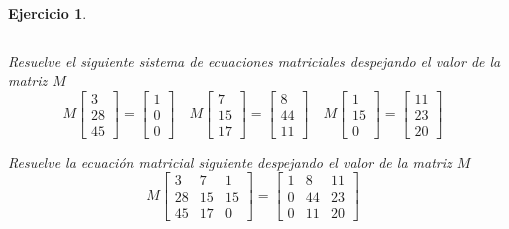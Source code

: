 \documentclass[12pt]{amsart}
\newtheorem{ejer}{Ejercicio}
\begin{document}
\begin{ejer}
\begin{minipage}{\textwidth}
\begin{tcolorbox}[colback = green!20!white,title=Versión Aplicación]
\[\]\end{tcolorbox}
\end{minipage} \newline
\noindent\begin{minipage}{\textwidth}
\begin{tcolorbox}[colback = blue!20!white,title=Versión Sistema Matricial]
Resuelve el siguiente sistema de ecuaciones matriciales despejando el valor de la matriz $M$
\[M \left[\begin{array}{r}
3 \\
28 \\
45
\end{array}\right] = \left[\begin{array}{r}
1 \\
0 \\
0
\end{array}\right] \quad M \left[\begin{array}{r}
7 \\
15 \\
17
\end{array}\right] = \left[\begin{array}{r}
8 \\
44 \\
11
\end{array}\right] \quad M \left[\begin{array}{r}
1 \\
15 \\
0
\end{array}\right] = \left[\begin{array}{r}
11 \\
23 \\
20
\end{array}\right] \quad 
\]\end{tcolorbox}
\end{minipage} \newline
\noindent\begin{minipage}{\textwidth} 
\begin{tcolorbox}[colback = red!20!white,title=Versión Ecuación Matricial]
Resuelve la ecuación matricial siguiente despejando el valor de la matriz $M$
\[M \left[\begin{array}{rrr}
3 & 7 & 1 \\
28 & 15 & 15 \\
45 & 17 & 0
\end{array}\right] = \left[\begin{array}{rrr}
1 & 8 & 11 \\
0 & 44 & 23 \\
0 & 11 & 20
\end{array}\right] \quad 
\]
\end{tcolorbox}
\end{minipage}%
\end{ejer}
\end{document}

